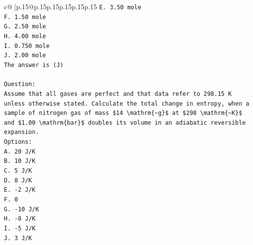 \documentclass{article}
\begin{document}
{\begin{supertabular}{c@{$\;$}|p{.15\linewidth}@{}p{.15\linewidth}p{.15\linewidth}p{.15\linewidth}p{.15\linewidth}p{.15\linewidth}}
{{{\texttt{E. 3.50 mole} \\
\texttt{F. 1.50 mole} \\
\texttt{G. 2.50 mole} \\
\texttt{H. 4.00 mole} \\
\texttt{I. 0.750 mole} \\
\texttt{J. 2.00 mole} \\
\texttt{The answer is (J)} \\
\\ 
\texttt{Question:} \\
\texttt{Assume that all gases are perfect and that data refer to 298.15 K unless otherwise stated. Calculate the total change in entropy, when a sample of nitrogen gas of mass \$14 \textbackslash{}mathrm\{\textasciitilde{}g\}\$ at \$298 \textbackslash{}mathrm\{\textasciitilde{}K\}\$ and \$1.00 \textbackslash{}mathrm\{bar\}\$ doubles its volume in an adiabatic reversible expansion.} \\
\texttt{Options:} \\
\texttt{A. 20 J/K} \\
\texttt{B. 10 J/K} \\
\texttt{C. 5 J/K} \\
\texttt{D. 8 J/K} \\
\texttt{E. {-}2 J/K} \\
\texttt{F.  0} \\
\texttt{G. {-}10 J/K} \\
\texttt{H. {-}8 J/K} \\
\texttt{I. {-}5 J/K} \\
\texttt{J. 3 J/K} \\
            }
        }
    }
     \\ \\


\end{supertabular}}
\end{document}
